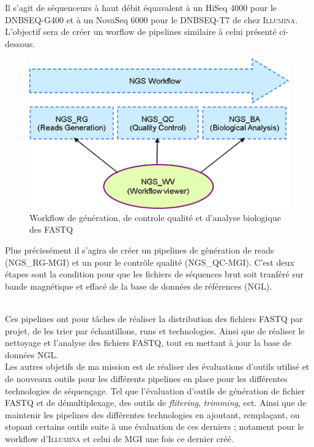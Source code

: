 Il s'agit de séquenceurs à haut débit équavalent à un HiSeq 4000 pour le DNBSEQ-G400 et à un NovaSeq 6000 pour le DNBSEQ-T7 de chez \textsc{Illumina}. L'objectif sera de créer un worflow de pipelines similaire à celui présenté ci-dessous.

\begin{minipage}{0.45\textwidth}
	\begin{figure}[H]
		\centering
		\includegraphics[width=1\textwidth]{img/Workflow.png}
		\caption{Workflow de génération, de controle qualité et d’analyse biologique des FASTQ}
		\label{worflow-genoscope}
	\end{figure}
\end{minipage} 
\hfill
\begin{minipage}{0.45\textwidth}
	Plus précissément il s'agira de créer un pipelines de génération de reads (\textsc{NGS\_RG-MGI}) et un pour le contrôle qualité (\textsc{NGS\_QC-MGI}). C'est deux étapes sont la condition pour que les fichiers de séquences brut soit tranféré sur bande magnétique et effacé de la base de données de références (\textsc{NGL}). 
\end{minipage}\\

Ces pipelines ont pour tâches de réaliser la distribution des fichiers \textsc{FASTQ} par projet, de les trier par échantillons, runs et technologies. Ainsi que de réaliser le nettoyage et l'analyse des fichiers \textsc{FASTQ}, tout en  mettant à jour la base de données \textsc{NGL}.\\

Les autres objetifs de ma mission est de réaliser des évaluations d'outils utilisé et de nouveaux outils pour les différents pipelines en place pour les différentes technologies de séquençage. Tel que l'évaluation d'outils de génération de fichier \textsc{FASTQ} et de démultiplexage, des outils de \emph{flitering}, \emph{trimming}, ect. Ainsi que de maintenir les pipelines des différentes technologies en ajoutant, remplaçant, ou stopant certains outils suite à une évaluation de ces derniers ; notament pour le workflow d'\textsc{Illumina} et celui de \textsc{MGI} une fois ce dernier créé.
